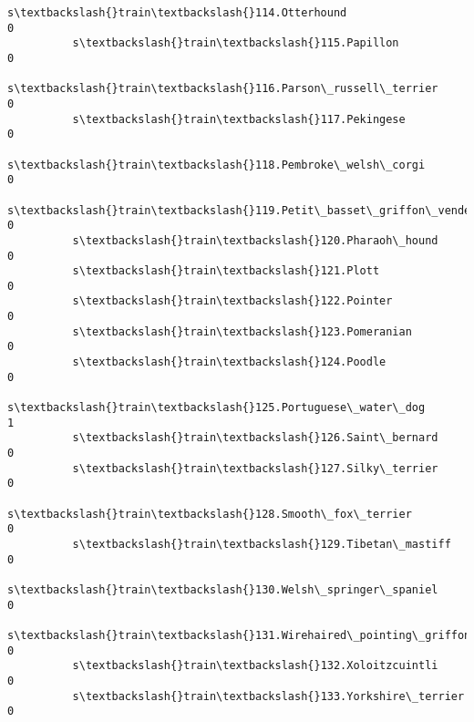 \documentclass[11pt]{article}
\begin{document}
\begin{Verbatim}[commandchars=\\\{\}]
          s\textbackslash{}train\textbackslash{}114.Otterhound                                                         0   
          s\textbackslash{}train\textbackslash{}115.Papillon                                                           0   
          s\textbackslash{}train\textbackslash{}116.Parson\_russell\_terrier                                             0   
          s\textbackslash{}train\textbackslash{}117.Pekingese                                                          0   
          s\textbackslash{}train\textbackslash{}118.Pembroke\_welsh\_corgi                                               0   
          s\textbackslash{}train\textbackslash{}119.Petit\_basset\_griffon\_vendeen                                       0   
          s\textbackslash{}train\textbackslash{}120.Pharaoh\_hound                                                      0   
          s\textbackslash{}train\textbackslash{}121.Plott                                                              0   
          s\textbackslash{}train\textbackslash{}122.Pointer                                                            0   
          s\textbackslash{}train\textbackslash{}123.Pomeranian                                                         0   
          s\textbackslash{}train\textbackslash{}124.Poodle                                                             0   
          s\textbackslash{}train\textbackslash{}125.Portuguese\_water\_dog                                               1   
          s\textbackslash{}train\textbackslash{}126.Saint\_bernard                                                      0   
          s\textbackslash{}train\textbackslash{}127.Silky\_terrier                                                      0   
          s\textbackslash{}train\textbackslash{}128.Smooth\_fox\_terrier                                                 0   
          s\textbackslash{}train\textbackslash{}129.Tibetan\_mastiff                                                    0   
          s\textbackslash{}train\textbackslash{}130.Welsh\_springer\_spaniel                                             0   
          s\textbackslash{}train\textbackslash{}131.Wirehaired\_pointing\_griffon                                        0   
          s\textbackslash{}train\textbackslash{}132.Xoloitzcuintli                                                     0   
          s\textbackslash{}train\textbackslash{}133.Yorkshire\_terrier                                                  0   
          

\end{Verbatim}
\end{document}
